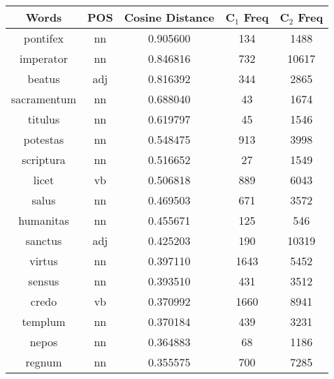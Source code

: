 \begin{table}
\centering
\begin{tabular}{ccccc} 
\toprule
\textbf{ Words } & \textbf{ POS } & \textbf{ Cosine Distance } & \textbf{ C$_1$ Freq } & \textbf{ C$_2$ Freq }  \\ 
\midrule
pontifex         & nn            & 0.905600           & 134                & 1488                \\
imperator        & nn            & 0.846816           & 732                & 10617               \\
beatus           & adj           & 0.816392           & 344                & 2865                \\
sacramentum      & nn            & 0.688040           & 43                 & 1674                \\
titulus          & nn            & 0.619797           & 45                 & 1546                \\
potestas         & nn            & 0.548475           & 913                & 3998                \\
scriptura        & nn            & 0.516652           & 27                 & 1549                \\
licet            & vb            & 0.506818           & 889                & 6043                \\
salus            & nn            & 0.469503           & 671                & 3572                \\
humanitas        & nn            & 0.455671           & 125                & 546                 \\
sanctus          & adj           & 0.425203           & 190                & 10319               \\
virtus           & nn            & 0.397110           & 1643               & 5452                \\
sensus           & nn            & 0.393510           & 431                & 3512                \\
credo            & vb            & 0.370992           & 1660               & 8941                \\
templum          & nn            & 0.370184           & 439                & 3231                \\
nepos            & nn            & 0.364883           & 68                 & 1186                \\
regnum           & nn            & 0.355575           & 700                & 7285                \\

\end{tabular}
\end{table}
